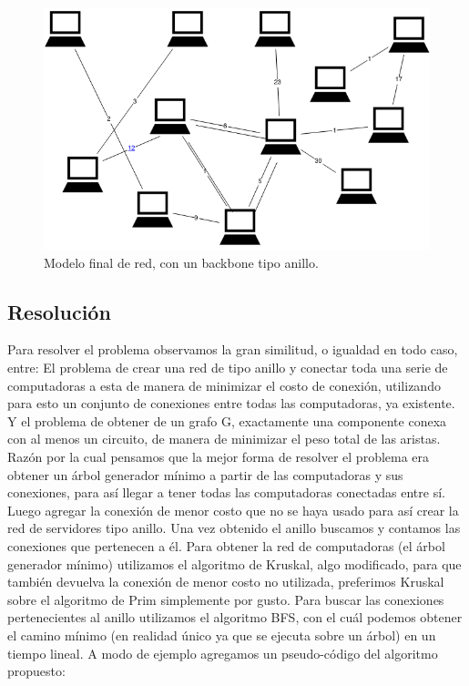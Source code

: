 \begin{figure}[H]
\begin{center}
\includegraphics[scale=.35]{./imagenes/ej3_ejemplo2.png}
\caption{Modelo final de red, con un backbone tipo anillo.}
\end{center}
\end{figure}

\newpage


\subsection{Resoluci\'on}

Para resolver el problema observamos la gran similitud, o igualdad en todo caso, entre:
El problema de crear una red de tipo anillo y conectar toda una serie de computadoras a esta de manera de minimizar el costo de conexión, utilizando para esto un conjunto de conexiones entre todas las computadoras, ya existente.
Y el problema de obtener de un grafo G, exactamente una componente conexa con al menos un circuito, de manera de minimizar el peso total de las aristas. Razón por la cual pensamos que la mejor forma de resolver el problema era obtener un árbol generador mínimo a partir de las computadoras y sus conexiones, para así llegar a tener todas las computadoras conectadas entre sí. Luego agregar la conexión de menor costo que no se haya usado para así crear la red de servidores tipo anillo.
Una vez obtenido el anillo buscamos y contamos las conexiones que pertenecen a \'el.
Para obtener la red de computadoras (el \'arbol generador m\'inimo) utilizamos el algoritmo de Kruskal, algo modificado, para que tambi\'en devuelva la conexi\'on de menor costo no utilizada, preferimos Kruskal sobre el algoritmo de Prim simplemente por gusto. Para buscar las conexiones pertenecientes al anillo utilizamos el algoritmo BFS, con el cu\'al podemos obtener el camino m\'inimo (en realidad \'unico ya que se ejecuta sobre un \'arbol) en un tiempo lineal.
A modo de ejemplo agregamos un pseudo-código del algoritmo propuesto:

